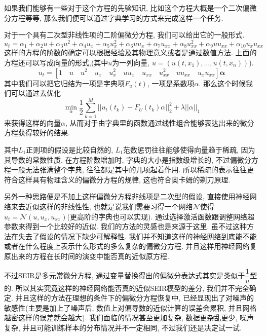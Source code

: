 \documentclass[lang=cn,11pt]{elegantpaper}
\begin{document}
如果我们能够有一些对于这个方程的先验知识, 比如这个方程大概是一个二次偏微分方程等等, 那么我们便可以通过字典学习的方式来完成这样一个任务.

对于一个具有二次型非线性项的二阶偏微分方程, 我们可以给出它的一般形式.
\large
\begin{equation}
	u_t=\alpha_1+\alpha_2u+\alpha_3u^2+\alpha_4u_x+\alpha_5u_x^2+\alpha_6uu_x+\alpha_7u_{xx}+\alpha_8u_{xx}^2+\alpha_9uu_{xx}+\alpha_{10}u_xu_{xx}
\end{equation}
\normalsize
这样的方程的阶数的确定可以根据经验及其物理意义或者是通过数值方法. 上面的方程还可以写成向量的形式,(其中$u$为一列向量, $u=(u(t,x_1), \dots, u(t,x_n))$).
\large
\begin{equation}
	u_t=[1\quad u\quad u^2\quad u_x\quad u_x^2\quad uu_x\quad u_{xx}\quad u_{xx}^2\quad uu_{xx}\quad u_xu_{xx}] \mathbf \alpha
\end{equation}
\normalsize
其中我们可以把它归结为一项是字典项$F_u(t)$, 一项是系数项$\alpha$. 那么这个时候我们可以通过去优化
\large
\begin{equation}
	\min_\alpha \dfrac{1}{2}\sum_{k=1}^M ||u_t(t_k)-F_U(t_k)\alpha||_2^2+\lambda||\alpha||_1
\end{equation}
\normalsize
来获得这样的向量$\alpha$, 从而对于由字典里的函数通过线性组合能够表达出来的微分方程获得较好的结果. 

其中$L_1$正则项的假设是比较自然的, $L_1$范数惩罚往往能够使得向量趋于稀疏, 因为其导数的常数性质. 在方程阶数增加时, 字典的大小是指数级增长的, 不过偏微分方程一般无法张满整个字典, 往往都是其中的几项起着作用. 所以稀疏的表示往往更符合这样具有物理含义的偏微分方程的规律, 这也符合奥卡姆的剃刀原理\cite{Schaeffer2017}.

另外一种思路便是不加上这样偏微分方程非线项是二次型的假设, 直接使用神经网络来去近似这样的非线性性, 也就是说我们需要习得一个网络$\mathcal N$使得$u_t=\mathcal N(u,u_x,u_{xx})$(更高阶的字典也可以实现). 通过选择激活函数跟调整网络超参数来得到一个比较好的近似. 我们的方法的灵感也是来源于这里. 虽不过这种方法在失去了假设的情况下缺少可解释性. 我们并不知道这样的神经网络到底能不能或者在什么程度上表示什么形式的多么复杂的偏微分方程. 并且这样用神经网络复原出来的方程在长时间的演变中能否真的近似原方程. 

不过SEIR是多元常微分方程, 通过变量替换得出的偏微分表达式其实是类似于$\dfrac{1}{u}$型的. 所以其实究竟这样的神经网络能否真的近似SEIR模型的差分, 我们并不完全确定. 并且这样的方法在理想的条件下的偏微分方程恢复中, 已经显现出了对噪声的敏感性(主要是加上了噪声后, 数值上对偏导数的近似计算的误差会累积\cite{long2019pde}, 并且网格越密这样的误差就会越大). 我们面临的情况甚至更加复杂, 数据更杂乱更少, 噪声复杂, 并且可能训练样本的分布情况并不一定相同, 不过我们还是决定试一试.
\end{document}
